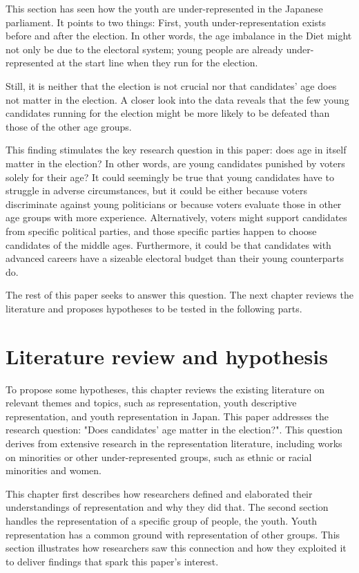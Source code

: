 \documentclass[a4paper, 12pt]{article}\usepackage[dvipdfmx]{graphicx}\usepackage[]{xcolor}
\begin{document}
This section has seen how the youth are under-represented in the Japanese parliament. It points to two things: First, youth under-representation exists before and after the election. In other words, the age imbalance in the Diet might not only be due to the electoral system; young people are already under-represented at the start line when they run for the election. 

Still, it is neither that the election is not crucial nor that candidates' age does not matter in the election. A closer look into the data reveals that the few young candidates running for the election might be more likely to be defeated than those of the other age groups. 

This finding stimulates the key research question in this paper: does age in itself matter in the election? In other words, are young candidates punished by voters solely for their age? It could seemingly be true that young candidates have to struggle in adverse circumstances, but it could be either because voters discriminate against young politicians or because voters evaluate those in other age groups with more experience. Alternatively, voters might support candidates from specific political parties, and those specific parties happen to choose candidates of the middle ages. Furthermore, it could be that candidates with advanced careers have a sizeable electoral budget than their young counterparts do. 

The rest of this paper seeks to answer this question. The next chapter reviews the literature and proposes hypotheses to be tested in the following parts. 

\section{Literature review and hypothesis} \label{ch3}

To propose some hypotheses, this chapter reviews the existing literature on relevant themes and topics, such as representation, youth descriptive representation, and youth representation in Japan. This paper addresses the research question: "Does candidates' age matter in the election?". This question derives from extensive research in the representation literature, including works on minorities or other under-represented groups, such as ethnic or racial minorities and women. 

This chapter first describes how researchers defined and elaborated their understandings of representation and why they did that. The second section handles the representation of a specific group of people, the youth. Youth representation has a common ground with representation of other groups. This section illustrates how researchers saw this connection and how they exploited it to deliver findings that spark this paper's interest. 
\end{document}
